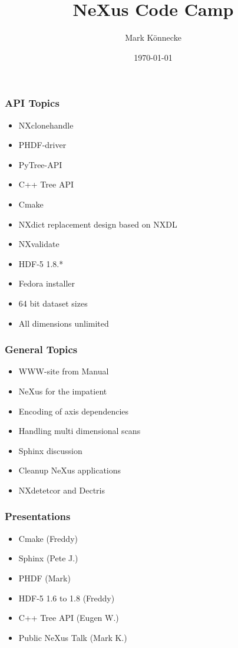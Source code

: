 \documentclass{beamer}
\title{NeXus Code Camp}
\author{Mark K\"onnecke }
\institute{Paul Scherrer Institute\\Switzerland }
\date{\today}
\begin{document}
\begin{frame}
\titlepage
\end{frame}

\begin{frame}
\frametitle{API Topics}
\begin{itemize}
\item NXclonehandle
\item PHDF-driver
\item PyTree-API
\item C++ Tree API
\item Cmake
\item NXdict replacement design based on NXDL
\item NXvalidate
\item HDF-5 1.8.*
\item Fedora installer
\item 64 bit dataset sizes
\item All dimensions unlimited
\end{itemize}
\end{frame}

\begin{frame}
\frametitle{General Topics}
\begin{itemize}
\item WWW-site from Manual
\item NeXus for the impatient
\item Encoding of axis dependencies
\item Handling multi dimensional scans
\item Sphinx discussion
\item Cleanup NeXus applications
\item NXdetetcor and Dectris
\end{itemize}
\end{frame}


\begin{frame}
\frametitle{Presentations}
\begin{itemize}
\item Cmake (Freddy)
\item Sphinx (Pete J.) 
\item PHDF (Mark)
\item HDF-5 1.6 to 1.8 (Freddy)
\item C++ Tree API (Eugen W.)
\item Public NeXus Talk (Mark K.) 
\end{itemize}
\end{frame}
\end{document}
